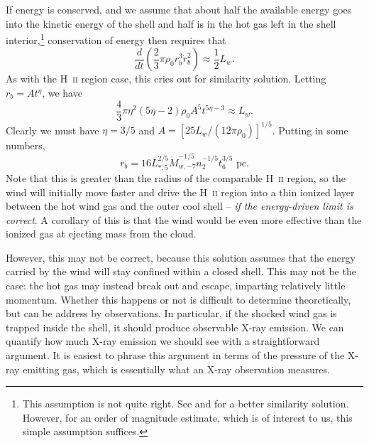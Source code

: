 If energy is conserved, and we assume that about half the available energy goes into the kinetic energy of the shell and half is in the hot gas left in the shell interior,\footnote{This assumption is not quite right. See \citet{castor75a} and \citet{weaver77a} for a better similarity solution. However, for an order of magnitude estimate, which is of interest to us, this simple assumption suffices.} conservation of energy then requires that
\begin{equation}
\frac{d}{dt} \left(\frac{2}{3}\pi \rho_0 r_b^3 \dot{r}_b^2\right) \approx \frac{1}{2} L_w.
\end{equation}
As with the H~\textsc{ii} region case, this cries out for similarity solution. Letting $r_b = A t^\eta$, we have
\begin{equation}
\frac{4}{3} \pi \eta^2 (5\eta-2) \rho_0 A^5 t^{5\eta-3} \approx L_w.
\end{equation}
Clearly we must have $\eta=3/5$ and $A=[25 L_w/(12\pi \rho_0)]^{1/5}$. Putting in some numbers,
\begin{equation}
r_b = 16 L_{*,5}^{2/5} \dot{M}_{w,-7}^{-1/5} n_2^{-1/5} t_6^{3/5}\mbox{ pc}.
\end{equation}
Note that this is greater than the radius of the comparable H~\textsc{ii} region, so the wind will initially move faster and drive the H~\textsc{ii} region into a thin ionized layer between the hot wind gas and the outer cool shell -- {\it if the energy-driven limit is correct}. A corollary of this is that the wind would be even more effective than the ionized gas at ejecting mass from the cloud.

However, this may not be correct, because this solution assumes that the energy carried by the wind will stay confined within a closed shell. This may not be the case: the hot gas may instead break out and escape, imparting relatively little momentum. Whether this happens or not is difficult to determine theoretically, but can be address by observations. In particular, if the shocked wind gas is trapped inside the shell, it should produce observable X-ray emission. We can quantify how much X-ray emission we should see with a straightforward argument. It is easiest to phrase this argument in terms of the pressure of the X-ray emitting gas, which is essentially what an X-ray observation measures.

